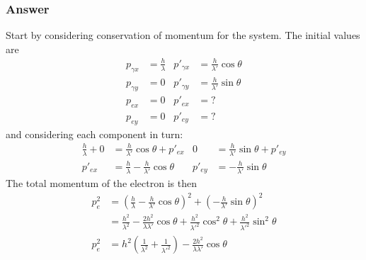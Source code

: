 \subsubsection{Answer}
Start by considering conservation of momentum for the system. The initial values
are
\begin{align*}
	p_{\gamma x} &= \frac{h}{{\lambda}}		&		p'_{\gamma x} &= \frac{h}{{\lambda}'} \cos \theta  \\
	p_{\gamma y} &= 0					&		p'_{\gamma y} &= \frac{h}{{\lambda}'} \sin \theta  \\
	p_{ex} &= 0					&		p'_{ex} &= ? \\
	p_{ey} &= 0					&		p'_{ey} &= ?
\end{align*}
and considering each component in turn:
\begin{align*}
	\frac{h}{{\lambda}} + 0 &= \frac{h}{{\lambda}'}\cos \theta  + p'_{ex}
		& 0 &= \frac{h}{{\lambda}'}\sin \theta  + p'_{ey}
	\\
	p'_{ex} &= \frac{h}{{\lambda}} - \frac{h}{{\lambda}'}\cos \theta 
		& p'_{ey} &= -\frac{h}{{\lambda}'}\sin \theta 
\end{align*}
The total momentum of the electron is then
\begin{align}
	p^2_e &= \left( \frac{h}{{\lambda}} - \frac{h}{{\lambda}'}\cos \theta  \right)^2 +
		\left( -\frac{h}{{\lambda}'}\sin \theta  \right)^2
		\nonumber
	\\
	{} &= \frac{h^2}{{\lambda}^2} - \frac{2h^2}{{\lambda}{\lambda}'}\cos \theta  + \frac{h^2}{{\lambda}'^2}\cos ^2\theta  +
		\frac{h^2}{{\lambda}'^2}\sin ^2\theta 
		\nonumber
	\\
	p^2_e &= h^2 \left( \frac{1}{{\lambda}^2} + \frac{1}{{\lambda}'^2} \right) -
		\frac{2h^2}{{\lambda}{\lambda}'}\cos \theta 
\end{align}

